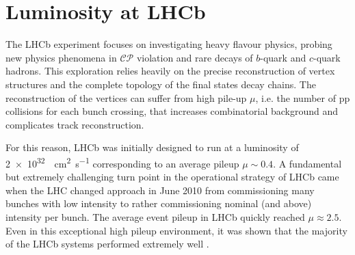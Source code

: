 


\section{Luminosity at LHCb}
The LHCb experiment focuses on investigating heavy flavour physics, probing new physics phenomena in $\mathcal{CP}$ violation and rare decays of $b$-quark and $c$-quark hadrons. This exploration relies heavily on the precise reconstruction of vertex structures and the complete topology of the final states decay chains. The reconstruction of the vertices can suffer from high pile-up $\mu$, i.e. the number of pp collisions for each bunch crossing, that increases combinatorial background and complicates track reconstruction.

For this reason, LHCb was initially designed to run at a luminosity of \SI{2e32}{\per\centi\meter\squared\per\second} corresponding to an average pileup $\mu\sim0.4$. A fundamental but extremely challenging turn point in the operational strategy of LHCb came when the LHC changed approach in June 2010 from commissioning many bunches with low intensity to rather commissioning nominal (and above) intensity per bunch. The average event pileup in LHCb quickly reached $\mu \approx 2.5$. Even in this exceptional high pileup environment, it was shown that the majority of the LHCb systems performed extremely well \cite{det_perf}.


